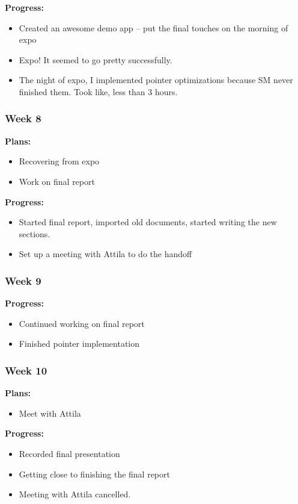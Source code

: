 \noindent \textbf{Progress:}
\begin{itemize}
\item Created an awesome demo app -- put the final touches on the morning of expo
\item Expo! It seemed to go pretty successfully.
\item The night of expo, I implemented pointer optimizations because SM never finished them. Took like, less than 3 hours.
\end{itemize}

\subsubsection{Week 8}

\noindent \textbf{Plans:}
\begin{itemize}
\item Recovering from expo
\item Work on final report
\end{itemize}

\noindent \textbf{Progress:}
\begin{itemize}
\item Started final report, imported old documents, started writing the new sections.
\item Set up a meeting with Attila to do the handoff
\end{itemize}

\subsubsection{Week 9}

\noindent \textbf{Progress:}
\begin{itemize}
\item Continued working on final report
\item Finished pointer implementation
\end{itemize}

\subsubsection{Week 10}

\noindent \textbf{Plans:}
\begin{itemize}
\item Meet with Attila
\end{itemize}

\noindent \textbf{Progress:}
\begin{itemize}
\item Recorded final presentation
\item Getting close to finishing the final report
\item Meeting with Attila cancelled.
\end{itemize}

